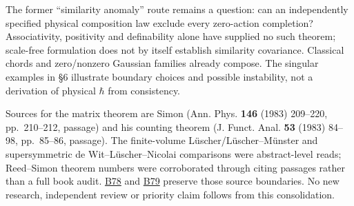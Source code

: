 \documentclass[11pt,a4paper]{article}
\begin{document}
The former ``similarity anomaly'' route remains a question: can an
independently specified physical composition law exclude every
zero-action completion? Associativity, positivity and definability alone
have supplied no such theorem; scale-free formulation does not by itself
establish similarity covariance. Classical chords and zero/nonzero
Gaussian families already compose. The singular examples in §6
illustrate boundary choices and possible instability, not a derivation
of physical \(\hbar\) from consistency.

Sources for the matrix theorem are Simon (Ann. Phys. \textbf{146} (1983)
209--220, pp.~210--212, passage) and his counting theorem (J. Funct.
Anal. \textbf{53} (1983) 84--98, pp.~85--86, passage). The finite-volume
Lüscher/Lüscher--Münster and supersymmetric de Wit--Lüscher--Nicolai
comparisons were abstract-level reads; Reed--Simon theorem numbers were
corroborated through citing passages rather than a full book audit.
\href{../references/batches/B78.md}{B78} and
\href{../references/batches/B79.md}{B79} preserve those source
boundaries. No new research, independent review or priority claim
follows from this consolidation.
\end{document}
